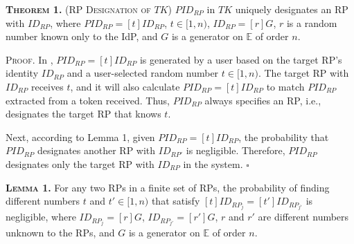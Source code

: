 \vspace{2mm}
\noindent\textsc{\textbf{Theorem 1.} (RP Designation of $TK$)} { $PID_{RP}$ in $TK$ uniquely designates an RP with $ID_{RP}$, where $PID_{RP}= [t]ID_{RP}$, $t \in [1,n)$, $ID_{RP} = [r]G$, $r$ is a random number known only to the IdP, and $G$ is a generator on $\mathbb{E}$ of order $n$.}

\vspace{0.85mm}
\noindent\textsc{Proof.} In \usso, $PID_{RP}=[t]ID_{RP}$ is generated by a user based on the target RP's identity $ID_{RP}$ and a user-selected random number $t \in [1,n)$.
The target RP with $ID_{RP}$ receives $t$,
     and it will also calculate $PID_{RP}=[t]ID_{RP}$ to match $PID_{RP}$ extracted from a token received.
Thus, $PID_{RP}$ always specifies an RP, i.e., %
designates the target RP that knows $t$.

Next, according to Lemma 1, given $PID_{RP} = [t]ID_{RP}$, the probability that $PID_{RP}$ designates another RP with $ID_{RP'}$ is negligible. %
Therefore, $PID_{RP}$ designates only the target RP with $ID_{RP}$ in the system.  \hfill $\square$

\vspace{2mm}
\noindent\textsc{\textbf{Lemma 1.}} { For any two RPs in a finite set of RPs, the probability of finding different numbers $t$ and $t' \in [1,n)$ that satisfy $[t]ID_{RP_j} = [t']ID_{RP_{j'}}$ is negligible, where $ID_{RP_j}=[r]G$, $ID_{RP_{j'}}=[r']G$, $r$ and $r'$ are different numbers unknown to the RPs, and $G$ is a generator on $\mathbb{E}$ of order $n$.}


